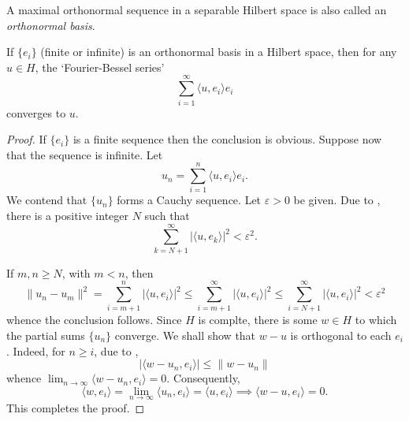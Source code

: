 \begin{definition}
    A maximal orthonormal sequence in a separable Hilbert space is also called an \emph{orthonormal basis}.
\end{definition}


\begin{theorem}
    If $\{e_i\}$ (finite or infinite) is an orthonormal basis in a Hilbert space, then for any $u\in H$, the `Fourier-Bessel series' 
    \begin{equation*}
        \sum_{i = 1}^\infty\langle u, e_i\rangle e_i
    \end{equation*}
    converges to $u$.
\end{theorem}
\begin{proof}
    If $\{e_i\}$ is a finite sequence then the conclusion is obvious. Suppose now that the sequence is infinite. Let 
    \begin{equation*}
        u_n = \sum_{i = 1}^n\langle u, e_i\rangle e_i.
    \end{equation*}
    We contend that $\{u_n\}$ forms a Cauchy sequence. Let $\varepsilon > 0$ be given. Due to , there is a positive integer $N$ such that 
    \begin{equation*}
        \sum_{k = N + 1}^\infty|\langle u, e_k\rangle|^2 < \varepsilon^2.
    \end{equation*}

    If $m,n\ge N$, with $m < n$, then 
    \begin{equation*}
        \|u_n - u_m\|^2 = \sum_{i = m + 1}^n|\langle u,e_i\rangle|^2\le\sum_{i = m + 1}^\infty|\langle u, e_i\rangle|^2\le\sum_{i = N + 1}^\infty|\langle u, e_i\rangle|^2 < \varepsilon^2
    \end{equation*}
    whence the conclusion follows. Since $H$ is complte, there is some $w\in H$ to which the partial sums $\{u_n\}$ converge. We shall show that $w - u$ is orthogonal to each $e_i$. Indeed, for $n\ge i$, due to ,
    \begin{equation*}
        |\langle w - u_n, e_i\rangle|\le\|w - u_n\|
    \end{equation*}
    whence $\displaystyle\lim_{n\to\infty}\langle w - u_n, e_i\rangle = 0$. Consequently, 
    \begin{equation*}
        \langle w, e_i\rangle = \lim_{n\to\infty}\langle u_n, e_i\rangle = \langle u, e_i\rangle\implies\langle w - u, e_i\rangle = 0.
    \end{equation*}
    This completes the proof.
\end{proof}

